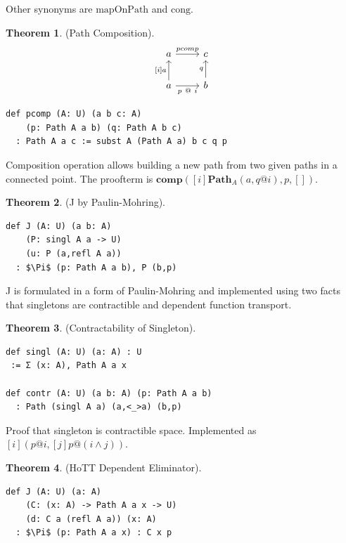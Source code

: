 \documentclass{article}
\theoremstyle{definition}
\newtheorem{theorem}{Theorem}
\begin{document}
Other synonyms are $\mathrm{mapOnPath}$ and $\mathrm{cong}$.

\newpage
\begin{theorem} (Path Composition).
$$
\begin{tikzcd}
  a \arrow[r, "pcomp"] & c \\
  a \arrow[u, "{[i]a}"] \arrow[r, "p\ @\ i"'] & b \arrow[u, "q"]
\end{tikzcd}
$$
\begin{lstlisting}[mathescape=true]
def pcomp (A: U) (a b c: A)
    (p: Path A a b) (q: Path A b c)
  : Path A a c := subst A (Path A a) b c q p
\end{lstlisting}
\end{theorem}

Composition operation allows building a new path from two given paths
in a connected point. The proofterm is
$\mathbf{comp}([i] \mathbf{Path}_A(a,q@i),p,[])$.

\begin{theorem} (J by Paulin-Mohring).
\begin{lstlisting}[mathescape=true]
def J (A: U) (a b: A)
    (P: singl A a -> U)
    (u: P (a,refl A a))
  : $\Pi$ (p: Path A a b), P (b,p)
\end{lstlisting}
\end{theorem}

J is formulated in a form of Paulin-Mohring and implemented using
two facts that singletons are contractible and dependent function
transport.

\begin{theorem} (Contractability of Singleton).
\begin{lstlisting}[mathescape=true]
def singl (A: U) (a: A) : U
 := Σ (x: A), Path A a x

def contr (A: U) (a b: A) (p: Path A a b)
  : Path (singl A a) (a,<_>a) (b,p)
\end{lstlisting}
\end{theorem}

Proof that singleton is contractible space. Implemented as $[i] (p @ i, [j] p @ (i \land j))$.

\begin{theorem} (HoTT Dependent Eliminator).
\begin{lstlisting}[mathescape=true]
def J (A: U) (a: A)
    (C: (x: A) -> Path A a x -> U)
    (d: C a (refl A a)) (x: A)
  : $\Pi$ (p: Path A a x) : C x p
\end{lstlisting}
\end{theorem}
\end{document}

